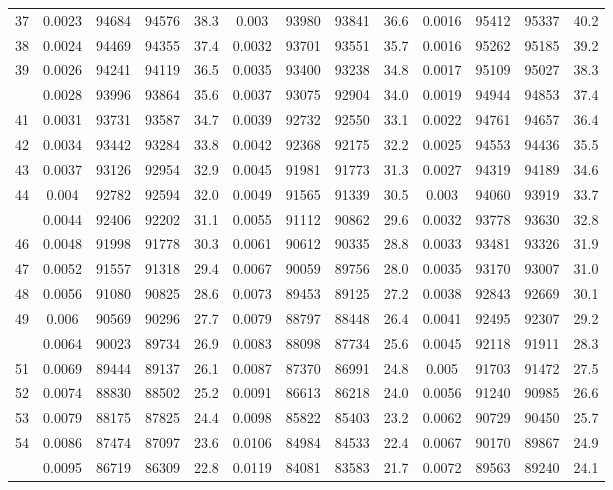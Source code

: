 \documentclass[
  14pt,
]{article}
\begin{document}
\begin{longtable}[t]{lcccccccccccc}
37 & 0.0023 & 94684 & 94576 & 38.3 & 0.003 & 93980 & 93841 & 36.6 & 0.0016 & 95412 & 95337 & 40.2\\
38 & 0.0024 & 94469 & 94355 & 37.4 & 0.0032 & 93701 & 93551 & 35.7 & 0.0016 & 95262 & 95185 & 39.2\\
39 & 0.0026 & 94241 & 94119 & 36.5 & 0.0035 & 93400 & 93238 & 34.8 & 0.0017 & 95109 & 95027 & 38.3\\
\addlinespace
40 & 0.0028 & 93996 & 93864 & 35.6 & 0.0037 & 93075 & 92904 & 34.0 & 0.0019 & 94944 & 94853 & 37.4\\
41 & 0.0031 & 93731 & 93587 & 34.7 & 0.0039 & 92732 & 92550 & 33.1 & 0.0022 & 94761 & 94657 & 36.4\\
42 & 0.0034 & 93442 & 93284 & 33.8 & 0.0042 & 92368 & 92175 & 32.2 & 0.0025 & 94553 & 94436 & 35.5\\
43 & 0.0037 & 93126 & 92954 & 32.9 & 0.0045 & 91981 & 91773 & 31.3 & 0.0027 & 94319 & 94189 & 34.6\\
44 & 0.004 & 92782 & 92594 & 32.0 & 0.0049 & 91565 & 91339 & 30.5 & 0.003 & 94060 & 93919 & 33.7\\
\addlinespace
45 & 0.0044 & 92406 & 92202 & 31.1 & 0.0055 & 91112 & 90862 & 29.6 & 0.0032 & 93778 & 93630 & 32.8\\
46 & 0.0048 & 91998 & 91778 & 30.3 & 0.0061 & 90612 & 90335 & 28.8 & 0.0033 & 93481 & 93326 & 31.9\\
47 & 0.0052 & 91557 & 91318 & 29.4 & 0.0067 & 90059 & 89756 & 28.0 & 0.0035 & 93170 & 93007 & 31.0\\
48 & 0.0056 & 91080 & 90825 & 28.6 & 0.0073 & 89453 & 89125 & 27.2 & 0.0038 & 92843 & 92669 & 30.1\\
49 & 0.006 & 90569 & 90296 & 27.7 & 0.0079 & 88797 & 88448 & 26.4 & 0.0041 & 92495 & 92307 & 29.2\\
\addlinespace
50 & 0.0064 & 90023 & 89734 & 26.9 & 0.0083 & 88098 & 87734 & 25.6 & 0.0045 & 92118 & 91911 & 28.3\\
51 & 0.0069 & 89444 & 89137 & 26.1 & 0.0087 & 87370 & 86991 & 24.8 & 0.005 & 91703 & 91472 & 27.5\\
52 & 0.0074 & 88830 & 88502 & 25.2 & 0.0091 & 86613 & 86218 & 24.0 & 0.0056 & 91240 & 90985 & 26.6\\
53 & 0.0079 & 88175 & 87825 & 24.4 & 0.0098 & 85822 & 85403 & 23.2 & 0.0062 & 90729 & 90450 & 25.7\\
54 & 0.0086 & 87474 & 87097 & 23.6 & 0.0106 & 84984 & 84533 & 22.4 & 0.0067 & 90170 & 89867 & 24.9\\
\addlinespace
55 & 0.0095 & 86719 & 86309 & 22.8 & 0.0119 & 84081 & 83583 & 21.7 & 0.0072 & 89563 & 89240 & 24.1\\

\end{longtable}
\end{document}
